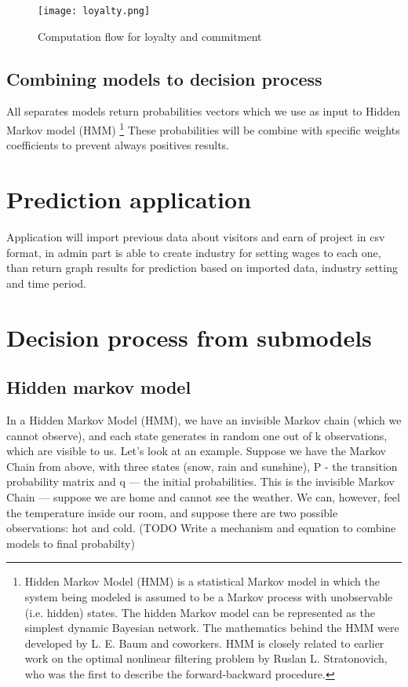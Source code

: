 \begin{figure}[h!]
    \begin{center}
        \texttt{[image: loyalty.png]}
    \end{center}
    \caption{Computation flow for loyalty and commitment}
    \label{Loyalty scheme}
\end{figure}
\subsection{Combining models to decision process} \label{subsec:combining_models}
All separates models return probabilities vectors which we use as input to Hidden Markov model (HMM) \footnote{Hidden Markov Model (HMM) is a statistical Markov model
in which the system being modeled is assumed to be a Markov process with unobservable (i.e. hidden) states.
The hidden Markov model can be represented as the simplest dynamic Bayesian network.
The mathematics behind the HMM were developed by L. E. Baum and coworkers.
HMM is closely related to earlier work on the optimal nonlinear filtering problem by Ruslan L. Stratonovich,
who was the first to describe the forward-backward procedure.}
These probabilities will be combine with specific weights coefficients to prevent always positives results.
\section{Prediction application} \label{sec:app}
Application will import previous data about visitors and earn of project in csv format, in admin part is able to
create industry for setting wages to each one, than return graph results for prediction based on imported data,
industry setting and time period.

\section{Decision process from submodels} \label{sec:decision}
\subsection{Hidden markov model} \label{subsec:hhm}
In a Hidden Markov Model (HMM), we have an invisible Markov chain (which we cannot observe), and each state
generates in random one out of k observations, which are visible to us. Let’s look at an example.
Suppose we have the Markov Chain from above, with three states (snow, rain and sunshine),
P - the transition probability matrix and q — the initial probabilities.
This is the invisible Markov Chain — suppose we are home and cannot see the weather.
We can, however, feel the temperature inside our room, and suppose there are two possible observations: hot and cold.
(TODO Write a mechanism and equation to combine models to final probabilty)
